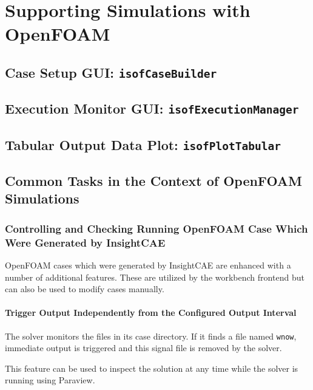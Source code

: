 \section{Supporting Simulations with OpenFOAM}

\subsection{Case Setup GUI: \texttt{isofCaseBuilder}}

\subsection{Execution Monitor GUI: \texttt{isofExecutionManager}}

\subsection{Tabular Output Data Plot: \texttt{isofPlotTabular}}







\subsection{Common Tasks in the Context of OpenFOAM Simulations}

\subsubsection{Controlling and Checking Running OpenFOAM Case Which Were Generated by InsightCAE}

OpenFOAM cases which were generated by InsightCAE are enhanced with a number of additional features.
These are utilized by the workbench frontend but can also be used to modify cases manually.

\paragraph{Trigger Output Independently from the Configured Output Interval}
\label{par:trigger_output_of}

The solver monitors the files in its case directory.
If it finds a file named \verb!wnow!, immediate output is triggered and this signal file is removed by the solver.

This feature can be used to inspect the solution at any time while the solver is running using Paraview.

